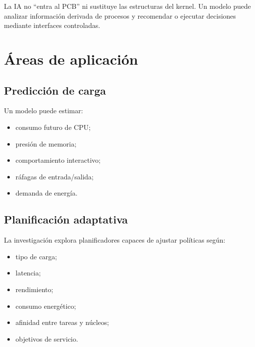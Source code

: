 \documentclass[
  spanish,
  letterpaper,
]{scrbook}
\providecommand{\tightlist}{%
  \setlength{\itemsep}{0pt}\setlength{\parskip}{0pt}}
\begin{document}
\begin{tcolorbox}[enhanced jigsaw, arc=.35mm, bottomrule=.15mm, bottomtitle=1mm, breakable, colback=white, colbacktitle=quarto-callout-important-color!10!white, colframe=quarto-callout-important-color-frame, coltitle=black, left=2mm, leftrule=.75mm, opacityback=0, opacitybacktitle=0.6, rightrule=.15mm, title=\textcolor{quarto-callout-important-color}{\faExclamation}\hspace{0.5em}{Aclaración}, titlerule=0mm, toprule=.15mm, toptitle=1mm]

La IA no ``entra al PCB'' ni sustituye las estructuras del kernel. Un
modelo puede analizar información derivada de procesos y recomendar o
ejecutar decisiones mediante interfaces controladas.

\end{tcolorbox}

\section{Áreas de aplicación}\label{uxe1reas-de-aplicaciuxf3n}

\subsection{Predicción de carga}\label{predicciuxf3n-de-carga}

Un modelo puede estimar:

\begin{itemize}
\tightlist
\item
  consumo futuro de CPU;
\item
  presión de memoria;
\item
  comportamiento interactivo;
\item
  ráfagas de entrada/salida;
\item
  demanda de energía.
\end{itemize}

\subsection{Planificación adaptativa}\label{planificaciuxf3n-adaptativa}

La investigación explora planificadores capaces de ajustar políticas
según:

\begin{itemize}
\tightlist
\item
  tipo de carga;
\item
  latencia;
\item
  rendimiento;
\item
  consumo energético;
\item
  afinidad entre tareas y núcleos;
\item
  objetivos de servicio.
\end{itemize}
\end{document}
